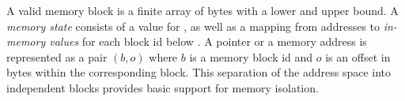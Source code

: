 A valid memory block is a
finite array of bytes with a lower and upper bound. A \emph{memory
state} consists of a value for \nextblock,
as well as a mapping from addresses to \emph{in-memory values}
for each block id below \nextblock.
A pointer or a memory address is represented as a pair $(b, o)$ where $b$ is a
memory block id and $o$ is an offset in bytes
within the corresponding block.
%
This separation of the address space into
independent blocks
provides basic support for memory isolation.

